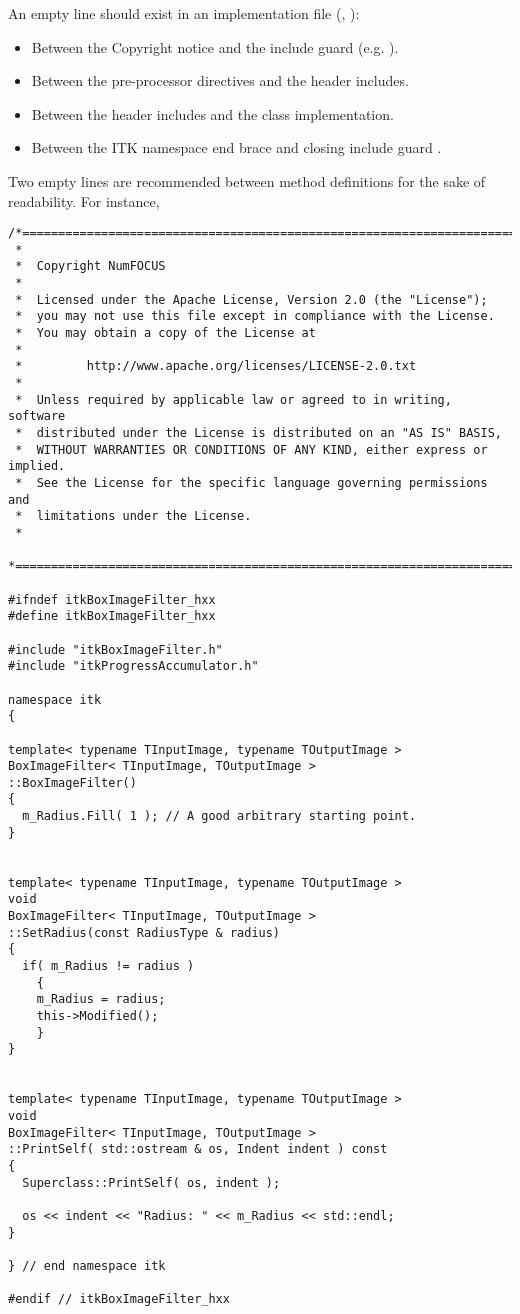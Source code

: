 An empty line should exist in an implementation file (, ):
\begin{itemize}
\item Between the Copyright notice and the include guard (e.g.
).
\item Between the pre-processor directives and the header includes.
\item Between the header includes and the class implementation.
\item Between the ITK namespace end brace  and
closing include guard .
\end{itemize}

Two empty lines are recommended between method definitions for the sake of
readability.
For instance,

\small
\begin{verbatim}
/*=========================================================================
 *
 *  Copyright NumFOCUS
 *
 *  Licensed under the Apache License, Version 2.0 (the "License");
 *  you may not use this file except in compliance with the License.
 *  You may obtain a copy of the License at
 *
 *         http://www.apache.org/licenses/LICENSE-2.0.txt
 *
 *  Unless required by applicable law or agreed to in writing, software
 *  distributed under the License is distributed on an "AS IS" BASIS,
 *  WITHOUT WARRANTIES OR CONDITIONS OF ANY KIND, either express or implied.
 *  See the License for the specific language governing permissions and
 *  limitations under the License.
 *
 *=========================================================================*/

#ifndef itkBoxImageFilter_hxx
#define itkBoxImageFilter_hxx

#include "itkBoxImageFilter.h"
#include "itkProgressAccumulator.h"

namespace itk
{

template< typename TInputImage, typename TOutputImage >
BoxImageFilter< TInputImage, TOutputImage >
::BoxImageFilter()
{
  m_Radius.Fill( 1 ); // A good arbitrary starting point.
}


template< typename TInputImage, typename TOutputImage >
void
BoxImageFilter< TInputImage, TOutputImage >
::SetRadius(const RadiusType & radius)
{
  if( m_Radius != radius )
    {
    m_Radius = radius;
    this->Modified();
    }
}


template< typename TInputImage, typename TOutputImage >
void
BoxImageFilter< TInputImage, TOutputImage >
::PrintSelf( std::ostream & os, Indent indent ) const
{
  Superclass::PrintSelf( os, indent );

  os << indent << "Radius: " << m_Radius << std::endl;
}

} // end namespace itk

#endif // itkBoxImageFilter_hxx
\end{verbatim}
\normalsize

